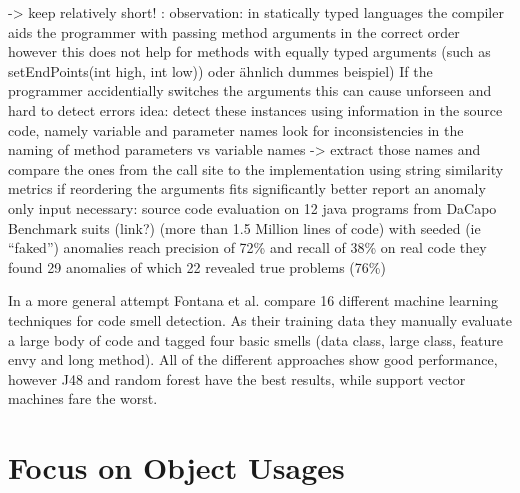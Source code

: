 -> keep relatively short!
\cite{pradel2011detecting}: 
observation: in statically typed languages the compiler aids the programmer with passing method arguments in the correct order
however this does not help for methods with equally typed arguments (such as setEndPoints(int high, int low)) oder ähnlich dummes beispiel)
If the programmer accidentially switches the arguments this can cause unforseen and hard to detect errors
idea: detect these instances using information in the source code, namely variable and parameter names
look for inconsistencies in the naming of method parameters vs variable names
-> extract those names and compare the ones from the call site to the implementation using string similarity metrics
if reordering the arguments fits significantly better report an anomaly
only input necessary: source code
evaluation on 12 java programs from DaCapo Benchmark suits (link?) (more than 1.5 Million lines of code)
with seeded (ie ``faked'') anomalies reach precision of 72\% and recall of 38\%
on real code they found 29 anomalies of which 22 revealed true problems (76\%)



In a more general attempt Fontana et al. \cite{fontana2013code}\cite{fontana2016comparing} compare 16 different machine learning techniques for code smell detection.
As their training data they manually evaluate a large body of code and tagged four basic smells (data class, large class, feature envy and long method).
All of the different approaches show good performance, however J48 and random forest have the best results, while support vector machines fare the worst.

\section{Focus on Object Usages}


